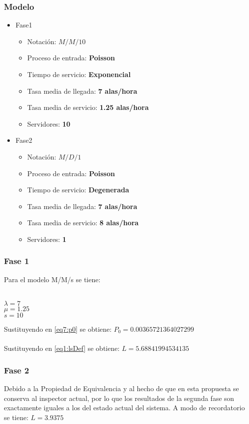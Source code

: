 \documentclass{article}
\begin{document}
\subsubsection{Modelo}
\begin{itemize}
	\item Fase1
		\begin{itemize}
			\item \large{Notación: } \textbf{$M/M/10$}
			\item \large{Proceso de entrada: } \textbf{Poisson}
			\item \large{Tiempo de servicio: } \textbf{Exponencial}
			\item \large{Tasa media de llegada: } \textbf{7 alas/hora}
			\item \large{Tasa media de servicio: } \textbf{1.25 alas/hora}
			\item \large{Servidores: } \textbf{10}
		\end{itemize}
	\item Fase2
		\begin{itemize}
			\item \large{Notación: } \textbf{$M/D/1$}
			\item \large{Proceso de entrada: } \textbf{Poisson}
			\item \large{Tiempo de servicio: } \textbf{Degenerada}
			\item \large{Tasa media de llegada: } \textbf{7 alas/hora}
			\item \large{Tasa media de servicio: } \textbf{8 alas/hora}
			\item \large{Servidores: } \textbf{1}
		\end{itemize}
\end{itemize}
\subsubsection{Fase 1}
Para el modelo M/M/s se tiene: \\\\
\begin{large}
$\lambda = 7$\\
$\mu = 1.25$\\
$ s = 10$\\
\end{large}
Sustituyendo en \ref{eq7:p0} se obtiene: $P_{0}=0.00365721364027299$\\\\
Sustituyendo en \ref{eq1:lsDef} se obtiene: $L = 5.68841994534135$

\subsubsection{Fase 2}
Debido a la Propiedad de Equivalencia y al hecho de que en esta propuesta 
se conserva al inspector actual, por lo que los resultados
de la segunda fase son exactamente iguales a los del estado actual del sistema.
A modo de recordatorio se tiene: $L = 3.9375$
\end{document}

